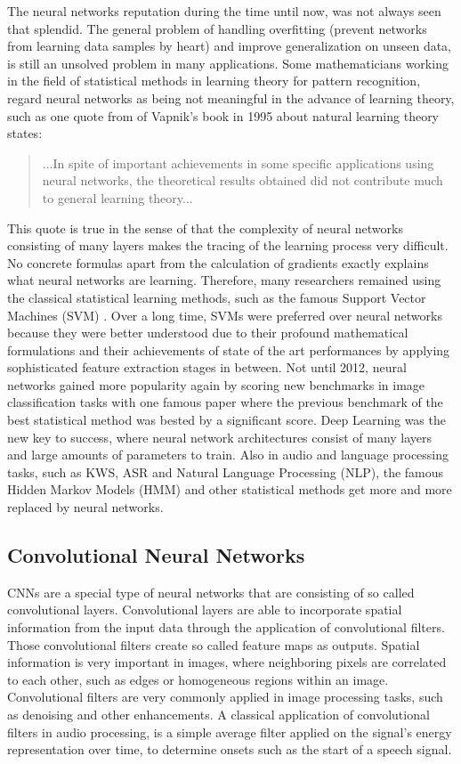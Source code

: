 The neural networks reputation during the time until now, was not always seen that splendid.
The general problem of handling overfitting (prevent networks from learning data samples by heart) and improve generalization on unseen data, is still an unsolved problem in many applications.
Some mathematicians working in the field of statistical methods in learning theory for pattern recognition, regard neural networks as being not meaningful in the advance of learning theory, such as one quote from \cite{Vapnik1995} of Vapnik's book in 1995 about natural learning theory states:
\begin{quote}
...In spite of important achievements in some specific applications using neural networks, the theoretical results obtained did not contribute much to general learning theory...
\end{quote}
This quote is true in the sense of that the complexity of neural networks consisting of many layers makes the tracing of the learning process very difficult.
No concrete formulas apart from the calculation of gradients exactly explains what neural networks are learning.
Therefore, many researchers remained using the classical statistical learning methods, such as the famous Support Vector Machines (SVM) \cite{Cortes1995}.
Over a long time, SVMs were preferred over neural networks because they were better understood due to their profound mathematical formulations and their achievements of state of the art performances by applying sophisticated feature extraction stages in between.
Not until 2012, neural networks gained more popularity again by scoring new benchmarks in image classification tasks with one famous paper \cite{Krizhevsky2012} where the previous benchmark of the best statistical method was bested by a significant score.
Deep Learning was the new key to success, where neural network architectures consist of many layers and large amounts of parameters to train.
Also in audio and language processing tasks, such as KWS, ASR and Natural Language Processing (NLP), the famous Hidden Markov Models (HMM) and other statistical methods get more and more replaced by neural networks.



\subsection{Convolutional Neural Networks}\label{sec:prev_nn_cnn}
CNNs are a special type of neural networks that are consisting of so called convolutional layers.
Convolutional layers are able to incorporate spatial information from the input data through the application of convolutional filters.
Those convolutional filters create so called feature maps as outputs.
Spatial information is very important in images, where neighboring pixels are correlated to each other, such as edges or homogeneous regions within an image.
Convolutional filters are very commonly applied in image processing tasks, such as denoising and other enhancements.
A classical application of convolutional filters in audio processing, is a simple average filter applied on the signal's energy representation over time, to determine onsets such as the start of a speech signal.

